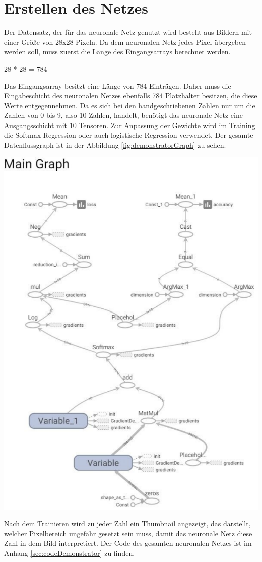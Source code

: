 \section{Erstellen des Netzes}
\label{sec:erstellenDesNetzes}
\printsubchapterauthor{\authorNiklas}
Der Datensatz, der für das neuronale Netz genutzt wird besteht aus Bildern mit einer Größe von 28x28 Pixeln. Da dem neuronalen Netz jedes Pixel übergeben werden soll, muss zuerst die Länge des Eingangsarrays berechnet werden.
\begin{center} 28 * 28 = 784\end{center}
Das Eingangsarray besitzt eine Länge von 784 Einträgen. Daher muss die Eingabeschicht des neuronalen Netzes ebenfalls 784 Platzhalter besitzen, die diese Werte entgegennehmen. Da es sich bei den handgeschriebenen Zahlen nur um die Zahlen von 0 bis 9, also 10 Zahlen, handelt, benötigt das neuronale Netz eine Ausgangsschicht mit 10 Tensoren. Zur Anpassung der Gewichte wird im Training die Softmax-Regression oder auch logistische Regression verwendet. Der gesamte Datenflussgraph ist in der Abbildung \ref{fig:demonstratorGraph} zu sehen.
\pagebreak
\begin{center}
\includegraphics[width=.6\textwidth]{../abbildungen/DemonstratorGraph.pdf}
	\label{fig:demonstratorGraph}
\end{center} 
Nach dem Trainieren wird zu jeder Zahl ein Thumbnail angezeigt, das darstellt, welcher Pixelbereich ungefähr gesetzt sein muss, damit das neuronale Netz diese Zahl in dem Bild interpretiert. Der Code des gesamten neuronalen Netzes ist im Anhang \ref{sec:codeDemonstrator} zu finden.

